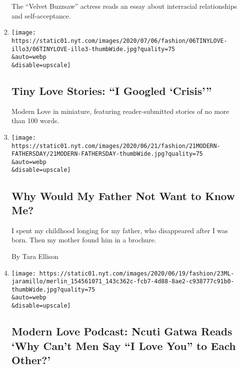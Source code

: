 \begin{enumerate}
  The ``Velvet Buzzsaw'' actress reads an essay about interracial
  relationships and self-acceptance.
\item
  \href{/2020/06/23/style/tiny-modern-love-stories-coronavirus-i-googled-crisis.html}{}

  \texttt{[image: https://static01.nyt.com/images/2020/07/06/fashion/06TINYLOVE-illo3/06TINYLOVE-illo3-thumbWide.jpg?quality=75\\\&auto=webp\\\&disable=upscale]}

  \hypertarget{tiny-love-stories-i-googled-crisis}{%
  \subsection{Tiny Love Stories: ``I Googled
  `Crisis'''}\label{tiny-love-stories-i-googled-crisis}}

  Modern Love in miniature, featuring reader-submitted stories of no
  more than 100 words.
\item
  \href{/2020/06/19/style/modern-love-coronavirus-missing-father.html}{}

  \texttt{[image: https://static01.nyt.com/images/2020/06/21/fashion/21MODERN-FATHERSDAY/21MODERN-FATHERSDAY-thumbWide.jpg?quality=75\\\&auto=webp\\\&disable=upscale]}

  \hypertarget{why-would-my-father-not-want-to-know-me}{%
  \subsection{Why Would My Father Not Want to Know
  Me?}\label{why-would-my-father-not-want-to-know-me}}

  I spent my childhood longing for my father, who disappeared after I
  was born. Then my mother found him in a brochure.

  By Tara Ellison
\item
  \href{/2020/06/17/style/modern-love-podcast-ncuti-gatwa.html}{}

  \texttt{[image: https://static01.nyt.com/images/2020/06/19/fashion/23ML-jaramillo/merlin\_154561071\_143c362c-fcb7-4d88-8ae2-c938777c91b0-thumbWide.jpg?quality=75\\\&auto=webp\\\&disable=upscale]}

  \hypertarget{modern-love-podcast-ncuti-gatwa-reads-why-cant-men-say-i-love-you-to-each-other}{%
  \subsection{Modern Love Podcast: Ncuti Gatwa Reads `Why Can't Men Say
  ``I Love You'' to Each
  Other?'}\label{modern-love-podcast-ncuti-gatwa-reads-why-cant-men-say-i-love-you-to-each-other}}


\end{enumerate}
